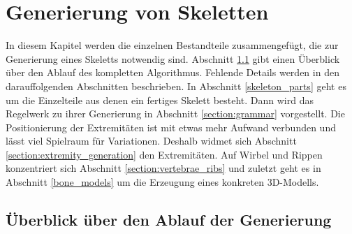 \chapter{Generierung von Skeletten}
\label{chapter:skeleton_generation}

In diesem Kapitel werden die einzelnen Bestandteile zusammengefügt, die zur Generierung eines Skeletts notwendig sind. 
Abschnitt \ref{section:overview} gibt einen Überblick über den Ablauf des kompletten Algorithmus. Fehlende Details werden in den darauffolgenden Abschnitten beschrieben.
In Abschnitt \ref{skeleton_parts} geht es um die Einzelteile aus denen ein fertiges Skelett besteht. Dann wird das Regelwerk zu ihrer Generierung in Abschnitt \ref{section:grammar} vorgestellt. Die Positionierung der Extremitäten ist mit etwas mehr Aufwand verbunden und lässt viel Spielraum für Variationen. Deshalb widmet sich Abschnitt \ref{section:extremity_generation} den Extremitäten. Auf Wirbel und Rippen konzentriert sich Abschnitt \ref{section:vertebrae_ribs} und zuletzt geht es in Abschnitt \ref{bone_models} um die Erzeugung eines konkreten 3D-Modells.


\section{Überblick über den Ablauf der Generierung}
\label{section:overview}

\vspace{0.1cm}

